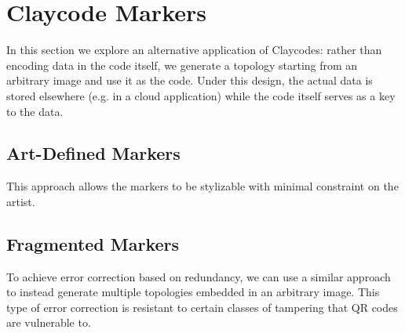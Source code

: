 \section{Claycode Markers}

In this section we explore an alternative application of Claycodes: rather than encoding data in the code itself, we generate a topology starting from an arbitrary image and use it as the code. Under this design, the actual data is stored elsewhere (e.g. in a cloud application) while the  code itself serves as a key to the data.

\subsection[artDefined]{Art-Defined Markers}

This approach allows the markers to be stylizable with minimal constraint on the artist.

\subsection[fragments]{Fragmented Markers}

To achieve error correction based on redundancy, we can use a similar approach to instead generate multiple topologies embedded in an arbitrary image. This type of error correction is resistant to certain classes of tampering that QR codes are vulnerable to.

